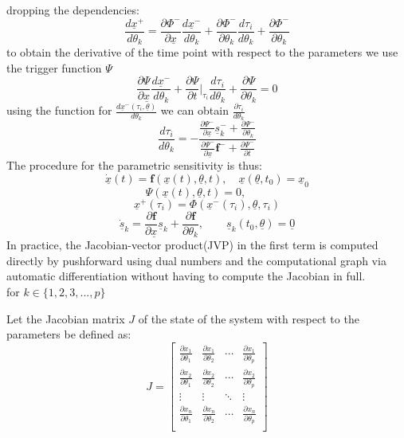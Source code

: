 \documentclass{article}
\begin{document}
dropping the dependencies:
\[
\frac{d \underline{x}^+}{d\theta_k} = \frac{\partial \Phi^-}{\partial \underline{x}}\frac{d \underline{x}^-}{d \theta_k} + \frac{\partial \Phi^-}{\partial\theta_k}\frac{d\tau_i}{d\theta_k}+\frac{\partial \Phi^-}{\partial\theta_k}
\]
to obtain the derivative of the time point with respect to the parameters we use the trigger function $\Psi$
\[
\frac{\partial \Psi}{\partial \underline{x}} \frac{d \underline{x}^-}{d \theta_k}+\frac{\partial \Psi}{\partial t}|_{\tau_i} \frac{d \tau_i}{d \theta_k}+\frac{\partial \Psi}{\partial \theta_k}=0
\]
using the function for $\frac{d \underline{x}^-(\tau_i, \underline{\theta})}{d \theta_k}$ we can obtain $\frac{\partial \tau_i}{d \theta_k}$
\[
\frac{d \tau_i}{d \theta_k}=-\frac{\frac{\partial \Psi^-}{\partial \underline{x}} \underline{s}^-_k+\frac{\partial \Psi^-}{\partial\theta_k}}{\frac{\partial \Psi^-}{\partial \underline{x}} \boldsymbol{f}^-+\frac{\partial \Psi^-}{\partial t}}
\]
The procedure for the parametric sensitivity is thus:
\[
\dot{\underline{x}}(t) = \boldsymbol{f}\left(\underline{x}(t),\underline{\theta}, t\right), \quad \underline{x}(\underline{\theta}, t_0) = \underline{x}_0
\]
\[
\Psi\left(\underline{x}(t),\underline{\theta}, t\right) = 0, \qquad 
\]
\[
\underline{x}^+(\tau_i) = \Phi\left(\underline{x}^-(\tau_i),\underline{\theta}, \tau_i\right)
\]
\[
\dot{\underline{s}}_k=\frac{\partial \boldsymbol{f}}{\partial \underline{x}} \underline{s}_k+\frac{\partial \boldsymbol{f}}{\partial \theta_k}, \qquad \underline{s}_k(t_0,\underline{\theta}) = \underline{0}
\]
In practice, the Jacobian-vector product(JVP) in the first term is computed directly by pushforward using dual numbers and the computational graph via automatic differentiation without having to compute the Jacobian in full. \\
[\textit{smooth infinitesimal analysis \& complex-step differentiation}]
for $k \in \{1,2,3,...,p\}$

Let the Jacobian matrix \(J\) of the state of the system with respect to the parameters be defined as:
\[
J = \begin{bmatrix}
\frac{\partial x_1}{\partial \theta_1} & \frac{\partial x_1}{\partial \theta_2} & \cdots & \frac{\partial x_1}{\partial \theta_p} \\
\frac{\partial x_2}{\partial \theta_1} & \frac{\partial x_2}{\partial \theta_2} & \cdots & \frac{\partial x_2}{\partial \theta_p} \\
\vdots & \vdots & \ddots & \vdots \\
\frac{\partial x_n}{\partial \theta_1} & \frac{\partial x_n}{\partial \theta_2} & \cdots & \frac{\partial x_n}{\partial \theta_p} \\
\end{bmatrix}
\]
\end{document}
